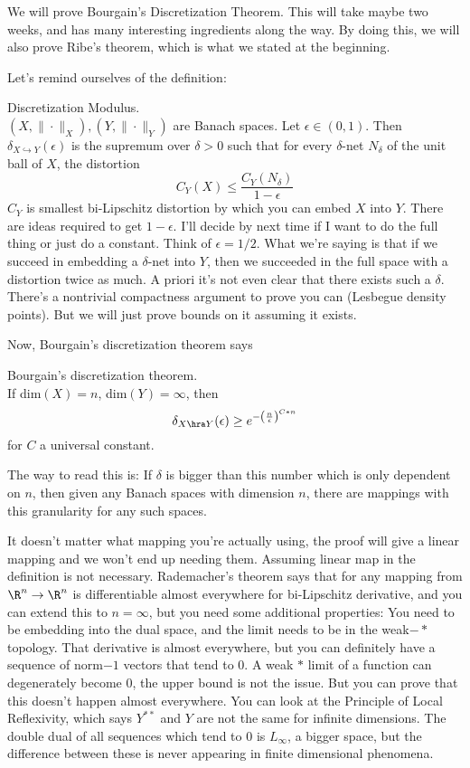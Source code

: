 We will prove Bourgain's Discretization Theorem. This will take maybe two weeks, and has many interesting ingredients along the way. By doing this, we will also prove Ribe's theorem, which is what we stated at the beginning. 

Let's remind ourselves of the definition: 

\begin{df} Discretization Modulus. \\
$(X, \|\cdot\|_X), (Y, \|\cdot\|_Y)$ are Banach spaces. Let $\epsilon \in (0, 1)$. Then $\delta_{X \hookrightarrow Y}(\epsilon)$ is the supremum over $\delta > 0$ such that for every $\delta$-net $N_{\delta}$ of the unit ball of $X$, the distortion 
\[
C_Y(X) \leq \frac{C_Y(N_{\delta})}{1 - \epsilon}
\]
$C_Y$ is smallest bi-Lipschitz distortion by which you can embed $X$ into $Y$. There are ideas required to get $1 - \epsilon$. I'll decide by next time if I want to do the full thing or just do a constant. Think of $\epsilon = 1/2$. What we're saying is that if we succeed in embedding a $\delta$-net into $Y$, then we succeeded in the full space with a distortion twice as much. A priori it's not even clear that there exists such a $\delta$. There's a nontrivial compactness argument to prove you can (Lesbegue density points). But we will just prove bounds on it assuming it exists. 
\end{df}

Now, Bourgain's discretization theorem says 
\begin{thm} Bourgain's discretization theorem. \\
If dim$(X) = n$, dim$(Y) = \infty$, then 
\[
\delta_{X \hra Y}(\epsilon) \geq e^{-\left(\frac{n}{\epsilon}\right)^{C*n}}
\]
for $C$ a universal constant. 
\end{thm}
The way to read this is: If $\delta$ is bigger than this number which is only dependent on $n$, then given any Banach spaces with dimension $n$, there are mappings with this granularity for any such spaces. 

\begin{rem}
It doesn't matter what mapping you're actually using, the proof will give a linear mapping and we won't end up needing them. Assuming linear map in the definition is not necessary. 
Rademacher's theorem says that for any mapping from $\R^n \to \R^n$ is differentiable almost everywhere for bi-Lipschitz derivative, and you can extend this to $n = \infty$, but you need some additional properties: You need to be embedding into the dual space, and the limit needs to be in the weak$-*$ topology. That derivative is almost everywhere, but you can definitely have a sequence of norm$-1$ vectors that tend to $0$. A weak $*$ limit of a function can degenerately become $0$, the upper bound is not the issue. But you can prove that this doesn't happen almost everywhere. You can look at the Principle of Local Reflexivity, which says $Y^{**}$ and $Y$ are not the same for infinite dimensions. The double dual of all sequences which tend to $0$ is $L_{\infty}$, a bigger space, but the difference between these is never appearing in finite dimensional phenomena. 
\end{rem}

